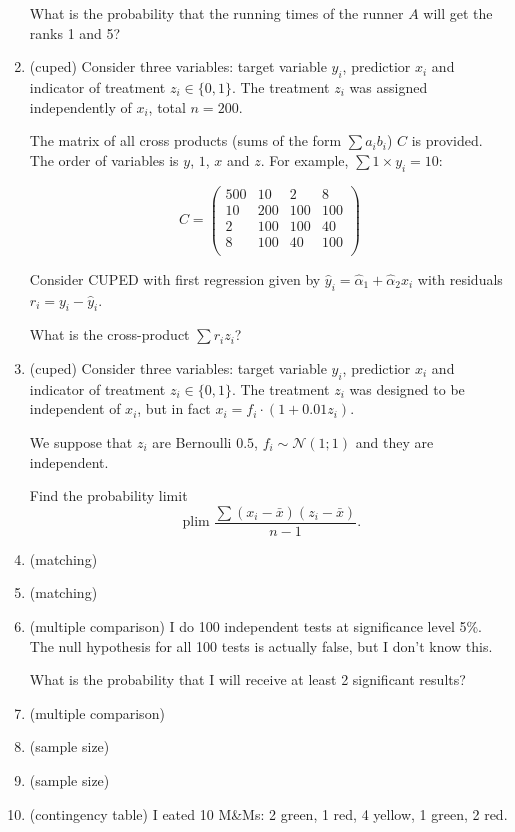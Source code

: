 \documentclass[12pt]{article}
\DeclareMathOperator{\plim}{plim}
\newcommand{\cN}{\mathcal{N}}
\begin{document}
\begin{enumerate}
    What is the probability that the running times of the runner $A$ will get the ranks 1 and 5?
    
    \item (cuped) Consider three variables: target variable $y_i$, predictior $x_i$ and indicator of treatment $z_i \in \{0,1\}$.
    The treatment $z_i$ was assigned independently of $x_i$, total $n=200$. 

    The matrix of all cross products (sums of the form $\sum a_i b_i$) $C$ is provided. 
    The order of variables is $y$, $1$, $x$ and $z$. For example, $\sum 1 \times y_i = 10$:

    \[
    C = \begin{pmatrix}
        500 & 10 & 2 & 8 \\
        10 & 200 & 100 & 100 \\
        2 &  100 & 100 &  40   \\
        8 &  100 & 40  & 100 \\
    \end{pmatrix}    
    \]
    
    Consider CUPED with first regression given by $\hat y_i = \hat\alpha_1 + \hat\alpha_2 x_i$ with residuals $r_i = y_i - \hat y_i$.

    What is the cross-product $\sum r_i z_i$?


    \item (cuped) Consider three variables: target variable $y_i$, predictior $x_i$ and indicator of treatment $z_i \in \{0,1\}$.
    The treatment $z_i$ was designed to be independent of $x_i$, but in fact $x_i = f_i \cdot (1 + 0.01 z_i)$.

    We suppose that $z_i$ are Bernoulli $0.5$, $f_i \sim \cN(1;1)$ and they are independent.

    Find the probability limit 
    \[
    \plim \frac{\sum (x_i - \bar x)(z_i - \bar x)}{n-1}.    
    \]


    \item (matching) 
    \item (matching)
    \item (multiple comparison) I do 100 independent tests at significance level 5\%. 
    The null hypothesis for all 100 tests is actually false, but I don't know this. 
    
    What is the probability that I will receive at least 2 significant results?
    
    \item (multiple comparison)
    \item (sample size)
    \item (sample size)
    \item (contingency table) I eated 10 M\&Ms: 2 green, 1 red, 4 yellow, 1 green, 2 red.  
    

\end{enumerate}
\end{document}
